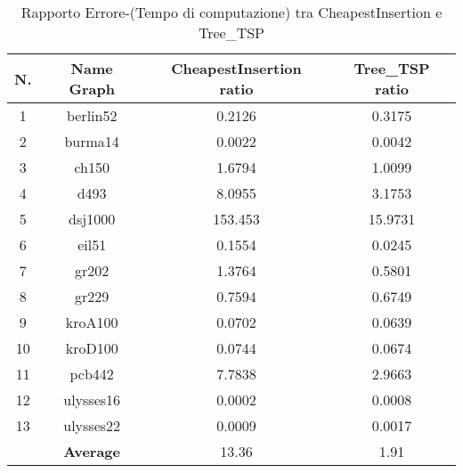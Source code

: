 \begin{table}[H]
	\centering
	\begin{tabular}{|c|c|c|c|}
		\hline
		\textbf{N.} & \textbf{Name Graph} & \textbf{CheapestInsertion ratio} & \textbf{Tree\_TSP ratio}\\ 
		\hline
		1 & berlin52 & 0.2126 & 0.3175\\
		\hline
		2 & burma14 & 0.0022 & 0.0042\\
		\hline
		3 & ch150 & 1.6794 & 1.0099\\
		\hline
		4 & d493 & 8.0955 & 3.1753\\
		\hline
		5 & dsj1000 & 153.453 & 15.9731\\
		\hline
		6 & eil51 & 0.1554 & 0.0245\\
		\hline
		7 & gr202 & 1.3764 & 0.5801\\
		\hline
		8 & gr229 & 0.7594 & 0.6749\\
		\hline
		9 & kroA100 & 0.0702 & 0.0639\\
		\hline
		10 & kroD100 & 0.0744 & 0.0674\\
		\hline
		11 & pcb442 & 7.7838 & 2.9663\\
		\hline
		12 & ulysses16 & 0.0002 & 0.0008\\
		\hline
		13 & ulysses22 & 0.0009 & 0.0017\\
		\hline
		& \textbf{Average} & 13.36 & 1.91\\
		\hline
	\end{tabular}
	\caption{Rapporto Errore-(Tempo di computazione) tra CheapestInsertion e Tree\_TSP}
	\label{rate}
\end{table} 

